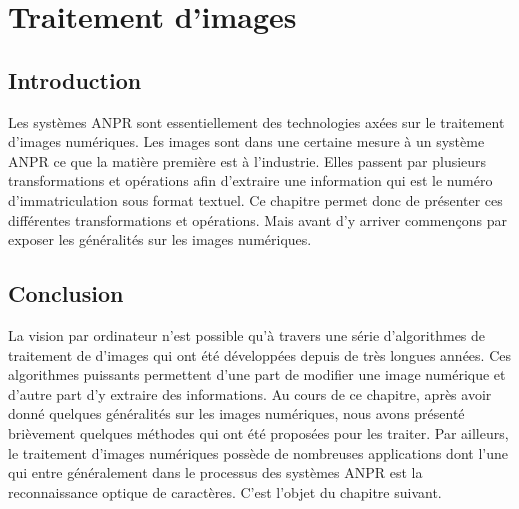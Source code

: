 \chapter{\textbf{Traitement d'images}}
    \section{Introduction}
    Les systèmes ANPR sont essentiellement des technologies axées sur le traitement d’images numériques. Les images sont dans une certaine mesure à un système ANPR ce que la matière première est à l’industrie. Elles passent par plusieurs transformations et opérations afin d'extraire une information qui est le numéro d’immatriculation sous format textuel. Ce chapitre permet donc de présenter ces différentes transformations et opérations. Mais avant d’y arriver commençons par exposer les généralités sur les images numériques.

    
    


    \section{Conclusion}
    La vision par ordinateur n’est possible qu’à travers une série d’algorithmes de traitement de d’images qui ont été développées depuis de très longues années. Ces algorithmes puissants permettent d’une part de modifier une image numérique  et d’autre part d'y  extraire des informations. Au cours de ce chapitre, après avoir donné quelques généralités sur les images numériques, nous avons présenté brièvement quelques méthodes qui ont été proposées pour les traiter. Par ailleurs, le traitement d’images numériques possède de nombreuses applications dont l’une qui entre généralement dans le processus des systèmes ANPR est la reconnaissance optique de caractères. C’est l’objet du chapitre suivant. 
